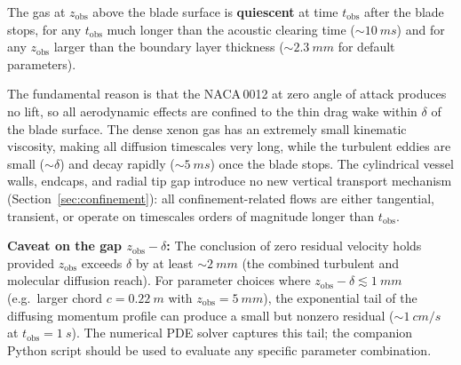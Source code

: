 \documentclass[11pt,a4paper]{article}
\begin{document}
The gas at $z_\mathrm{obs}$ above the blade surface is \textbf{quiescent}
at time $t_\mathrm{obs}$ after the blade stops, for any
$t_\mathrm{obs}$ much longer than the acoustic clearing time
($\sim\SI{10}{ms}$) and for any $z_\mathrm{obs}$ larger than the
boundary layer thickness ($\sim\SI{2.3}{mm}$ for default parameters).

The fundamental reason is that the NACA\,0012 at zero angle of attack
produces no lift, so all aerodynamic effects are confined to the thin
drag wake within $\delta$ of the blade surface. The dense xenon gas has
an extremely small kinematic viscosity, making all diffusion timescales
very long, while the turbulent eddies are small ($\sim\delta$) and
decay rapidly ($\sim\SI{5}{ms}$) once the blade stops. The cylindrical
vessel walls, endcaps, and radial tip gap introduce no new vertical
transport mechanism (Section~\ref{sec:confinement}): all
confinement-related flows are either tangential, transient, or operate
on timescales orders of magnitude longer than $t_\mathrm{obs}$.

\medskip
\noindent\textbf{Caveat on the gap $z_\mathrm{obs} - \delta$:}\;
The conclusion of zero residual velocity holds provided $z_\mathrm{obs}$
exceeds $\delta$ by at least $\sim\SI{2}{mm}$ (the combined turbulent
and molecular diffusion reach). For parameter choices where
$z_\mathrm{obs} - \delta \lesssim \SI{1}{mm}$ (e.g.\ larger chord
$c = \SI{0.22}{m}$ with $z_\mathrm{obs} = \SI{5}{mm}$), the
exponential tail of the diffusing momentum profile can produce a small
but nonzero residual ($\sim\SI{1}{cm/s}$ at $t_\mathrm{obs} = \SI{1}{s}$).
The numerical PDE solver captures this tail; the companion Python script
should be used to evaluate any specific parameter combination.
\end{document}
